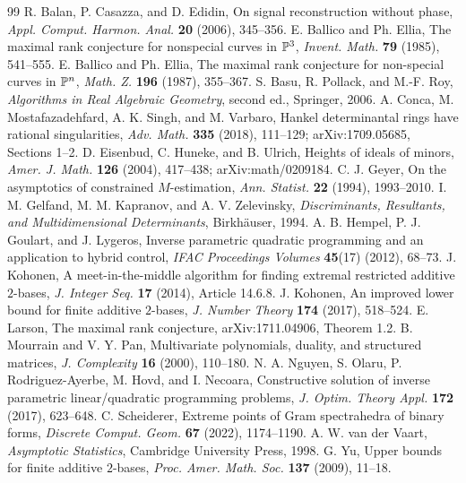 \begin{thebibliography}{99}
 R. Balan, P. Casazza, and D. Edidin, On signal reconstruction without phase, \emph{Appl. Comput. Harmon. Anal.} \textbf{20} (2006), 345--356.
 E. Ballico and Ph. Ellia, The maximal rank conjecture for nonspecial curves in $\mathbb P^3$, \emph{Invent. Math.} \textbf{79} (1985), 541--555.
 E. Ballico and Ph. Ellia, The maximal rank conjecture for non-special curves in $\mathbb P^n$, \emph{Math. Z.} \textbf{196} (1987), 355--367.
 S. Basu, R. Pollack, and M.-F. Roy, \emph{Algorithms in Real Algebraic Geometry}, second ed., Springer, 2006.
 A. Conca, M. Mostafazadehfard, A. K. Singh, and M. Varbaro, Hankel determinantal rings have rational singularities, \emph{Adv. Math.} \textbf{335} (2018), 111--129; arXiv:1709.05685, Sections 1--2.
 D. Eisenbud, C. Huneke, and B. Ulrich, Heights of ideals of minors, \emph{Amer. J. Math.} \textbf{126} (2004), 417--438; arXiv:math/0209184.
 C. J. Geyer, On the asymptotics of constrained $M$-estimation, \emph{Ann. Statist.} \textbf{22} (1994), 1993--2010.
 I. M. Gelfand, M. M. Kapranov, and A. V. Zelevinsky, \emph{Discriminants, Resultants, and Multidimensional Determinants}, Birkh\"auser, 1994.
 A. B. Hempel, P. J. Goulart, and J. Lygeros, Inverse parametric quadratic programming and an application to hybrid control, \emph{IFAC Proceedings Volumes} \textbf{45}(17) (2012), 68--73.
 J. Kohonen, A meet-in-the-middle algorithm for finding extremal restricted additive $2$-bases, \emph{J. Integer Seq.} \textbf{17} (2014), Article 14.6.8.
 J. Kohonen, An improved lower bound for finite additive $2$-bases, \emph{J. Number Theory} \textbf{174} (2017), 518--524.
 E. Larson, The maximal rank conjecture, arXiv:1711.04906, Theorem 1.2.
 B. Mourrain and V. Y. Pan, Multivariate polynomials, duality, and structured matrices, \emph{J. Complexity} \textbf{16} (2000), 110--180.
 N. A. Nguyen, S. Olaru, P. Rodriguez-Ayerbe, M. Hovd, and I. Necoara, Constructive solution of inverse parametric linear/quadratic programming problems, \emph{J. Optim. Theory Appl.} \textbf{172} (2017), 623--648.
 C. Scheiderer, Extreme points of Gram spectrahedra of binary forms, \emph{Discrete Comput. Geom.} \textbf{67} (2022), 1174--1190.
 A. W. van der Vaart, \emph{Asymptotic Statistics}, Cambridge University Press, 1998.
 G. Yu, Upper bounds for finite additive $2$-bases, \emph{Proc. Amer. Math. Soc.} \textbf{137} (2009), 11--18.
\end{thebibliography}
